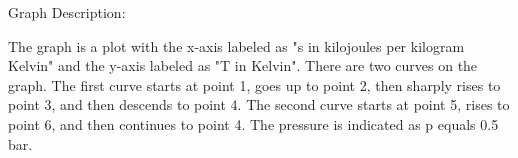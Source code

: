 Graph Description:

The graph is a plot with the x-axis labeled as "s in kilojoules per kilogram Kelvin" and the y-axis labeled as "T in Kelvin". There are two curves on the graph. The first curve starts at point 1, goes up to point 2, then sharply rises to point 3, and then descends to point 4. The second curve starts at point 5, rises to point 6, and then continues to point 4. The pressure is indicated as p equals 0.5 bar.